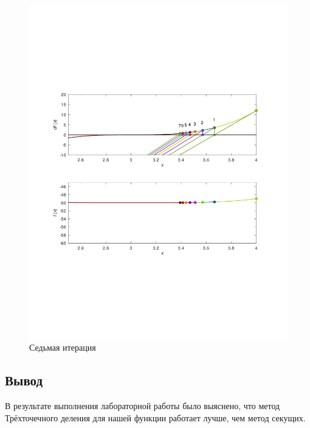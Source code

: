 \documentclass[a4paper,12pt]{article}
\begin{document}
    \begin{figure}[H]
        \centering
        \includegraphics[scale=0.4]{7secantitter.pdf}
        \caption{Седьмая итерация}
    \end{figure}
\newpage
\subsection*{Вывод}
В результате выполнения лабораторной работы было выяснено, что 
метод Трёхточечного деления для нашей функции работает лучше, чем метод секущих.
\end{document}
